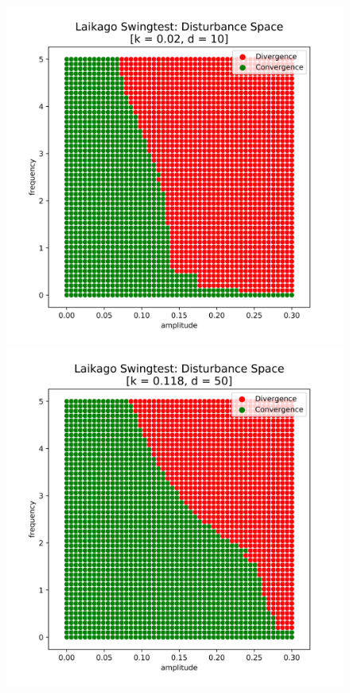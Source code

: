     \begin{figure}[h]\label{fig:}
        \centering
        \begin{minipage}{0.33\textwidth}
            \centering
            \includegraphics[width=\textwidth]{figures/swingtest_ds_bad.png} %
        \end{minipage}\hfill
        \begin{minipage}{0.33\textwidth}
            \centering
            \includegraphics[width=\textwidth]{figures/swingtest_ds_medium.png} %

\end{minipage}
\end{figure}

